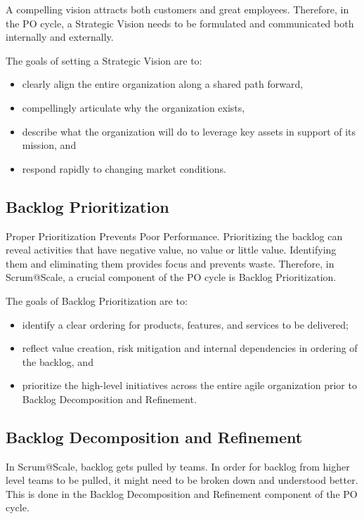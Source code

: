\documentclass[12pt,a4paper,parskip=full]{scrartcl}
\begin{document}
A compelling vision attracts both customers and great employees.
Therefore, in the PO cycle, a Strategic Vision needs to be formulated and communicated both internally and externally.

The goals of setting a Strategic Vision are to:

\begin{itemize}
	\item clearly align the entire organization along a shared path forward,
	\item compellingly articulate why the organization exists,
	\item describe what the organization will do to leverage key assets in support of its mission, and
	\item respond rapidly to changing market conditions.
\end{itemize}

\subsection{Backlog Prioritization}

Proper Prioritization Prevents Poor Performance.
Prioritizing the backlog can reveal activities that have negative value, no value or little value.
Identifying them and eliminating them provides focus and prevents waste.
Therefore, in Scrum@Scale, a crucial component of the PO cycle is Backlog Prioritization.

The goals of Backlog Prioritization are to:

\begin{itemize}
	\item identify a clear ordering for products, features, and services to be delivered;
	\item reflect value creation, risk mitigation and internal dependencies in ordering of the backlog, and
	\item prioritize the high-level initiatives across the entire agile organization prior to Backlog Decomposition and Refinement.
\end{itemize}

\subsection{Backlog Decomposition and Refinement}

In Scrum@Scale, backlog gets pulled by teams.
In order for backlog from higher level teams to be pulled, it might need to be broken down and understood better.
This is done in the Backlog Decomposition and Refinement component of the PO cycle.
\end{document}
